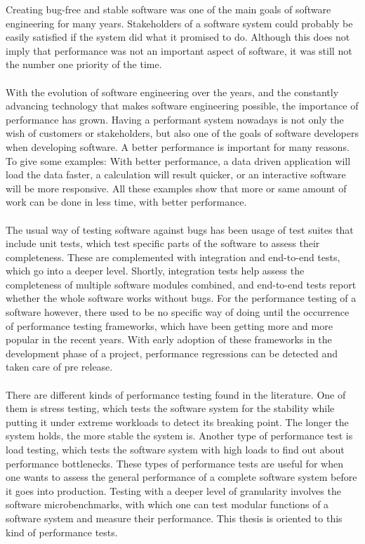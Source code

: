 \documentclass{seal_thesis}
\begin{document}
Creating bug-free and stable software was one of the main goals of software engineering for many years. Stakeholders of a software system could probably be easily satisfied if the system did what it promised to do. Although this does not imply that performance was not an important aspect of software, it was still not the number one priority of the time.\\
\\
With the evolution of software engineering over the years, and the constantly advancing technology that makes software engineering possible, the importance of performance has grown. Having a performant system nowadays is not only the wish of customers or stakeholders, but also one of the goals of software developers when developing software. A better performance is important for many reasons. To give some examples: With better performance, a data driven application  will load the data faster, a calculation will result quicker, or an interactive software will be more responsive. All these examples show that more or same amount of work can be done in less time, with better performance.\\
\\
The usual way of testing software against bugs has been usage of test suites that include unit tests, which test specific parts of the software to assess their completeness. These are complemented with integration and end-to-end tests, which go into a deeper level. Shortly, integration tests help assess the completeness of multiple software modules combined, and end-to-end tests report whether the whole software works without bugs. For the performance testing of a software however, there used to be no specific way of doing until the occurrence of performance testing frameworks, which have been getting more and more popular in the recent years. With early adoption of these frameworks in the development phase of a project, performance regressions can be detected and taken care of pre release.\\
\\
There are different kinds of performance testing found in the literature. One of them is stress testing, which tests the software system for the stability while putting it under extreme workloads to detect its breaking point. The longer the system holds, the more stable the system is. Another type of performance test is load testing, which tests the software system with high loads to find out about performance bottlenecks. These types of performance tests are useful for when one wants to assess the general performance of a complete software system before it goes into production. Testing with a deeper level of granularity involves the  software microbenchmarks, with which one can test modular functions of a software system and measure their performance. This thesis is oriented to this kind of performance tests.\\
\end{document}

